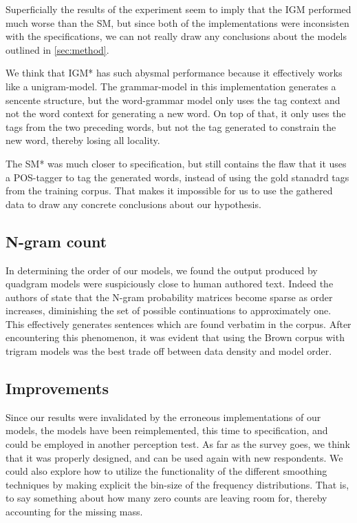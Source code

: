 \documentclass[ai15_group61_report.tex]{subfiles}
\begin{document}
Superficially the results of the experiment seem to imply that the IGM performed much worse than the SM, but since both of the implementations were inconsisten with the specifications, we can not really draw any conclusions about the models outlined in \ref{sec:method}.

We think that IGM* has such abysmal performance because it effectively works like a unigram-model. The grammar-model in this implementation generates a sencente structure, but the word-grammar model only uses the tag context and not the word context for generating a new word. On top of that, it only uses the tags from the two preceding words, but not the tag generated to constrain the new word, thereby losing all locality.

The SM* was much closer to specification, but still contains the flaw that it uses a POS-tagger to tag the generated words, instead of using the gold stanadrd tags from the training corpus. That makes it impossible for us to use the gathered data to draw any concrete conclusions about our hypothesis. 


\subsection{N-gram count}
In determining the order of our models, we found the output produced by quadgram models were suspiciously close to human authored text. Indeed the authors of \cite{Jurafsky2000} state that the N-gram probability matrices become sparse as order increases, diminishing the set of possible continuations to approximately one. This effectively generates sentences which are found verbatim in the corpus. After encountering this phenomenon, it was evident that using the Brown corpus with trigram models was the best trade off between data density and model order.  

\subsection{Improvements}
Since our results were invalidated by the erroneous implementations of our models, the models have been reimplemented, this time to specification, and could be employed in another perception test. As far as the survey goes, we think that it was properly designed, and can be used again with new respondents. We could also explore how to utilize the functionality of the different smoothing techniques by making explicit the bin-size of the frequency distributions. That is, to say something about how many zero counts are leaving room for, thereby accounting for the missing mass.
\end{document}
